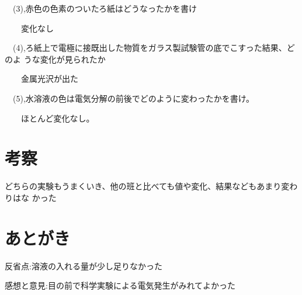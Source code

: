 \documentclass[11pt,a4j]{jarticle}
\begin{document}
\ \ (3),赤色の色素のついたろ紙はどうなったかを書け \par \ \ \ \ 変化なし \\ \par
\ \ (4),ろ紙上で電極に接既出した物質をガラス製試験管の底でこすった結果、どのよ うな変化が見られたか \par
\ \ \ \ 金属光沢が出た \\ \par
\ \ (5),水溶液の色は電気分解の前後でどのように変わったかを書け。\par
\ \ \ \ ほとんど変化なし。
\newpage
\section{考察} どちらの実験もうまくいき、他の班と比べても値や変化、結果などもあまり変わりはな かった
\section{あとがき} 反省点:溶液の入れる量が少し足りなかった \par 感想と意見:目の前で科学実験による電気発生がみれてよかった
\end{document}
